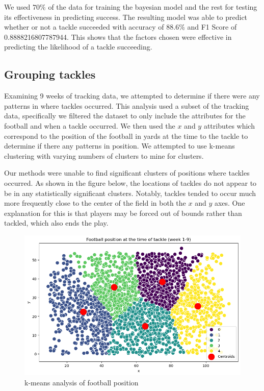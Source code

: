 \documentclass[bibtex, sigconf, hyperref={colorlinks=true,linkcolor=blue,urlcolor=blue}]{acmart}
\begin{document}
We used $70\%$ of the data for training the bayesian model and the rest for
testing its effectiveness in predicting success. The resulting model was able to
predict whether or not a tackle succeeded with accuracy of 88.6\% and F1 Score
of 0.8888216807787944. This shows that the factors chosen were effective in
predicting the likelihood of a tackle succeeding.

\subsection{Grouping tackles}

Examining 9 weeks of tracking data, we attempted to determine if there were any
patterns in where tackles occurred. This analysis used a subset of the tracking
data, specifically we filtered the dataset to only include the attributes for
the football and when a tackle occurred. We then used the $x$ and $y$ attributes
which correspond to the position of the football in yards at the time to the
tackle to determine if there any patterns in position.  We attempted to use
k-means clustering with varying numbers of clusters to mine for clusters.

Our methods were unable to find significant clusters of positions where tackles
occurred. As shown in the figure below, the locations of tackles do not appear
to be in any statistically significant clusters. Notably, tackles tended to
occur much more frequently close to the center of the field in both the $x$ and
$y$ axes. One explanation for this is that players may be forced out of bounds
rather than tackled, which also ends the play.

\begin{figure}[h]
  \centering
  \includegraphics[width=\linewidth]{k-means}
  \caption{k-means analysis of football position}
\end{figure}
\end{document}
